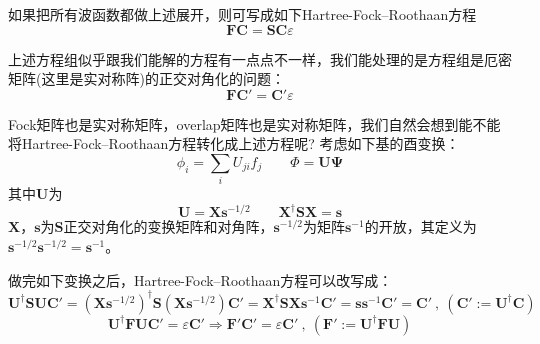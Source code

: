 如果把所有波函数都做上述展开，则可写成如下Hartree-Fock–Roothaan方程
\[\mathbf{F}\mathbf{C}=\mathbf{S}\mathbf{C}\varepsilon\]

上述方程组似乎跟我们能解的方程有一点点不一样，我们能处理的是方程组是厄密矩阵(这里是实对称阵)的正交对角化的问题：
\[\mathbf{F}\mathbf{C}'=\mathbf{C}'\varepsilon\]

Fock矩阵也是实对称矩阵，overlap矩阵也是实对称矩阵，我们自然会想到能不能将Hartree-Fock–Roothaan方程转化成上述方程呢?
考虑如下基的酉变换：
\[\phi_i = \sum_{i}U_{ji}f_j \qquad \mathbf{\varPhi}=\mathbf{U}\mathbf{\Psi}\]
其中$\mathbf{U}$为
\[\mathbf{U}=\mathbf{X}\mathbf{s}^{-1/2} \qquad \mathbf{X}^{\dagger}\mathbf{S}\mathbf{X}=\mathbf{s}\]
$\mathbf{X}$，$\mathbf{s}$为$\mathbf{S}$正交对角化的变换矩阵和对角阵，$\mathbf{s}^{-1/2}$为矩阵$\mathbf{s}^{-1}$的开放，其定义为$\mathbf{s}^{-1/2}\mathbf{s}^{-1/2}=\mathbf{s}^{-1}$。

做完如下变换之后，Hartree-Fock–Roothaan方程可以改写成：
\[\mathbf{U}^{\dagger}\mathbf{S}\mathbf{U}\mathbf{C}'=(\mathbf{X}\mathbf{s}^{-1/2})^{\dagger}\mathbf{S}(\mathbf{X}\mathbf{s}^{-1/2})\mathbf{C}'=\mathbf{X}^{\dagger}\mathbf{S}\mathbf{X}\mathbf{s}^{-1}\mathbf{C}'=\mathbf{s}\mathbf{s}^{-1}\mathbf{C}'=\mathbf{C}' \ , \ (\mathbf{C}':=\mathbf{U}^{\dagger}\mathbf{C})\]
\[\mathbf{U}^{\dagger}\mathbf{F}\mathbf{U}\mathbf{C}'=\varepsilon\mathbf{C}' \Rightarrow \mathbf{F}'\mathbf{C}'=\varepsilon\mathbf{C}' \ , \ (\mathbf{F}':=\mathbf{U}^{\dagger}\mathbf{F}\mathbf{U})\]


